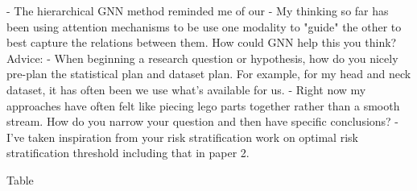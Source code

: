 \documentclass{article}%
\begin{document}
\newline%
\newline%
%
%
\newline%
\newline%
%
{-} The hierarchical GNN method reminded me of our %
\newline%
\newline%
%
%
\newline%
\newline%
%
{-} My thinking so far has been using attention mechanisms to be use one modality to "guide" the other to best capture the relations between them. How could GNN help this you think? %
\newline%
\newline%
%
%
\newline%
\newline%
%
Advice: %
\newline%
\newline%
%
{-} When beginning a research question or hypothesis, how do you nicely pre{-}plan the statistical plan and dataset plan. For example, for my head and neck dataset, it has often been we use what's available for us. %
\newline%
\newline%
%
%
\newline%
\newline%
%
{-} Right now my approaches have often felt like piecing lego parts together rather than a smooth stream. How do you narrow your question and then have specific conclusions? %
\newline%
\newline%
%
%
\newline%
\newline%
%
{-} I've taken inspiration from your risk stratification work on optimal risk stratification threshold including that in paper 2.%
\newline%
\newline%
%


\begin{table}[h!]%
\caption{Table}%
\begin{tabular}{|c|}%
\hline%
\\%
\hline%
\end{tabular}%
\end{table}

%
\end{document}

